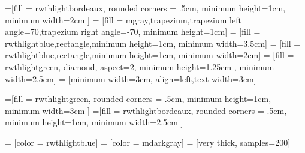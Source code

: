 







=[fill = rwthlightbordeaux, rounded corners = .5cm, minimum height=1cm, minimum width=2cm ]
 = [fill = mgray,trapezium,trapezium left angle=70,trapezium right angle=-70, minimum height=1cm]
 = [fill = rwthlightblue,rectangle,minimum height=1cm, minimum width=3.5cm]
 = [fill = rwthlightblue,rectangle,minimum height=1cm, minimum width=2cm]
 = [fill = rwthlightgreen, diamond, aspect=2, minimum height=1.25cm , minimum width=2.5cm]
 = [minimum width=3cm, align=left,text width=3cm]

=[fill = rwthlightgreen, rounded corners = .5cm, minimum height=1cm, minimum width=3cm ]
=[fill = rwthlightbordeaux, rounded corners = .5cm, minimum height=1cm, minimum width=2.5cm ]

 = [color = rwthlightblue]
 = [color = mdarkgray]
 = [very thick, samples=200]

